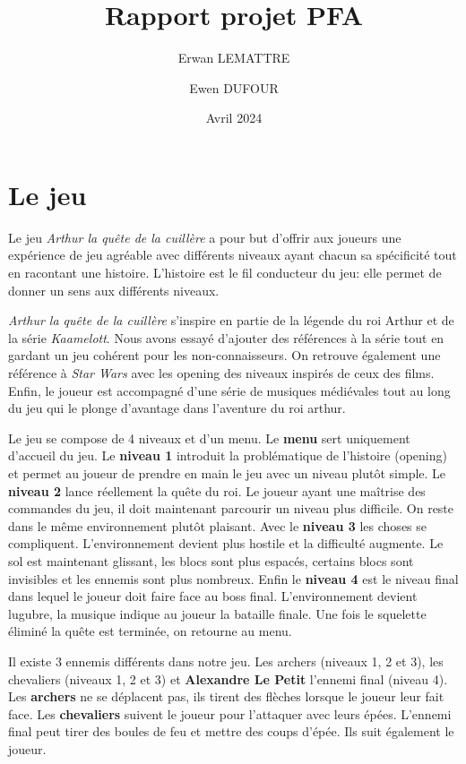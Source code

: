 \documentclass{article}
\title{Rapport projet PFA}
\author{Erwan LEMATTRE \and Ewen DUFOUR}
\date{Avril 2024}
\begin{document}
\maketitle

\newpage

\section{Le jeu}
Le jeu \textit{Arthur la quête de la cuillère} a pour but d'offrir aux joueurs une expérience 
de jeu agréable avec différents niveaux ayant chacun sa spécificité tout en racontant une histoire.
L'histoire est le fil conducteur du jeu: elle permet de donner un sens aux différents niveaux.

\textit{Arthur la quête de la cuillère} s'inspire en partie de la légende du roi Arthur et
 de la série \textit{Kaamelott}. Nous avons essayé d'ajouter des références à la série tout 
en gardant un jeu cohérent pour les non-connaisseurs. On retrouve également une référence 
à \textit{Star Wars} avec les opening des niveaux inspirés de ceux des films. Enfin, 
le joueur est accompagné d'une série de musiques médiévales tout au long du jeu qui le 
plonge d'avantage dans l'aventure du roi arthur.

Le jeu se compose de 4 niveaux et d'un menu. Le \textbf{menu} sert uniquement d'accueil du jeu.
Le \textbf{niveau 1} introduit la problématique de l'histoire (opening) et permet au joueur de 
prendre en main le jeu avec un niveau plutôt simple. Le \textbf{niveau 2} lance réellement la 
quête du roi. Le joueur ayant une maîtrise des commandes du jeu, il doit maintenant parcourir un 
niveau plus difficile. On reste dans le même environnement plutôt plaisant. Avec le \textbf{niveau 3} 
les choses se compliquent. L'environnement devient plus hostile et la difficulté augmente. Le sol 
est maintenant glissant, les blocs sont plus espacés, certains blocs sont invisibles et les ennemis sont 
plus nombreux. Enfin le \textbf{niveau 4} est le niveau final dans lequel le joueur doit faire face 
au boss final. L'environnement devient lugubre, la musique indique au joueur la bataille finale.
Une fois le squelette éliminé la quête est terminée, on retourne au menu.

Il existe 3 ennemis différents dans notre jeu. Les archers (niveaux 1, 2 et 3), les chevaliers (niveaux 1, 2 et 3)
et \textbf{Alexandre Le Petit} l'ennemi final (niveau 4). Les \textbf{archers} ne se déplacent pas, ils tirent des 
flèches lorsque le joueur leur fait face. Les \textbf{chevaliers} suivent le joueur pour l'attaquer avec leurs 
épées. L'ennemi final peut tirer des boules de feu et mettre des coups d'épée. Ils suit également le joueur.
\end{document}
